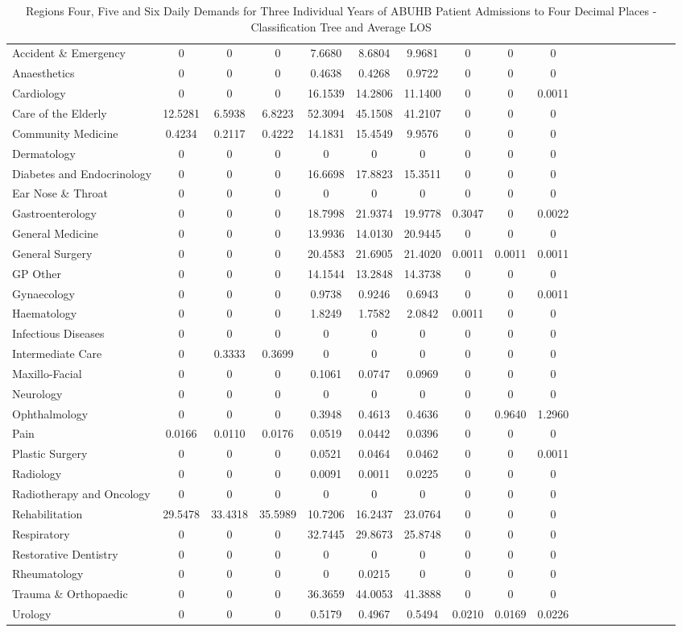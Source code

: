 \documentclass[thesis.tex]{subfiles}
\begin{document}
\begin{landscape}
\begin{table}[h!]
{\begin{tabular}{lcccccccccccccccccc}
Accident \& Emergency&	0	&0&	0	&7.6680	&8.6804&	9.9681&	0&	0&	0\\
Anaesthetics&	0	&0	&0	&0.4638	&0.4268&	0.9722&	0	&0	&0\\
Cardiology	&0	&0	&0	&16.1539	&14.2806&	11.1400&	0&	0	&0.0011\\
Care of the Elderly	&12.5281	&6.5938	&6.8223	&52.3094&	45.1508&	41.2107&	0&	0	&0\\
Community Medicine	&0.4234&	0.2117&	0.4222	&14.1831&	15.4549	&9.9576	&0	&0	&0\\
Dermatology	&0	&0	&0	&0&	0&	0&	0&	0&	0\\
Diabetes and Endocrinology	&0	&0&	0&16.6698&	17.8823	&15.3511	&0&	0	&0\\
Ear Nose \& Throat	&0&	0&	0	&0&	0	&0&	0	&0&	0\\
Gastroenterology	&0	&0	&0	&18.7998	&21.9374&	19.9778	&0.3047&	0&	0.0022\\
General Medicine	&0	&0&	0	&13.9936	&14.0130&	20.9445	&0&	0	&0\\
General Surgery&	0	&0	&0	&20.4583	&21.6905&21.4020&0.0011&	0.0011	&0.0011\\
GP Other&	0	&0&	0	&14.1544&	13.2848	&14.3738&	0	&0&	0\\
Gynaecology	&0	&0	&0	&0.9738&	0.9246	&0.6943&	0&	0	&0.0011\\
Haematology	&0	&0	&0	&1.8249	&1.7582&	2.0842&	0.0011&	0&	0\\
Infectious Diseases	&0	&0	&0	&0	&0	&0	&0&	0	&0\\
Intermediate Care&	0	&0.3333	&0.3699&0&	0&	0&	0	&0&	0\\
Maxillo-Facial	&0&	0&	0	&0.1061	&0.0747&	0.0969	&0&	0	&0\\
Neurology	&0&	0	&0	&0&	0	&0&	0	&0&	0\\
Ophthalmology	&0	&0	&0	&0.3948	&0.4613&0.4636&	0&	0.9640	&1.2960\\
Pain	&0.0166&	0.0110&	0.0176	&0.0519&	0.0442	&0.0396&	0&	0	&0\\
Plastic Surgery	&0	&0&0	&0.0521	&0.0464&	0.0462	&0	&0&	0.0011\\
Radiology	&0	&0&	0	&0.0091	&0.0011&	0.0225&	0&	0	&0\\
Radiotherapy and Oncology	&0&0	&0	&0&	0&	0&	0&	0&	0\\
Rehabilitation&	29.5478&	33.4318	&35.5989&10.7206	&16.2437	&23.0764&	0&	0&	0\\
Respiratory&	0&	0	&0	&32.7445	&29.8673	&25.8748&	0&	0	&0\\
Restorative Dentistry	&0&	0&	0&0&	0	&0	&0&	0	&0\\
Rheumatology	&0&	0&	0	&0	&0.0215	&0&	0&	0	&0\\
Trauma \& Orthopaedic	&0&	0	&0	&36.3659	&44.0053&	41.3888&	0	&0	&0\\
Urology&	0&	0	&0	&0.5179	&0.4967&	0.5494&	0.0210	&0.0169	&0.0226\\\bottomrule
\end{tabular}  } 
\caption{Regions Four, Five and Six Daily Demands for Three Individual Years of ABUHB Patient Admissions to Four Decimal Places - Classification Tree and Average LOS}
    \label{apptab:LinkedDemands8b}
\end{table}


\end{landscape}
\end{document}
